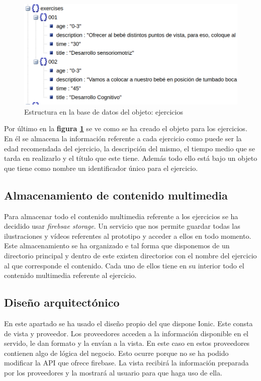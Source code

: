 \medskip
\begin{figure}
    \includegraphics[width=\linewidth]{./images/database/exercises-database.png}
    \caption{Estructura en la base de datos del objeto: ejercicios}
    \label{ejercicios}
\end{figure}

Por último en la \textbf{figura \ref{ejercicios}} se ve
como se ha creado el objeto para los ejercicios. En él se almacena la información
referente a cada ejercicio como puede ser la edad recomendada del ejercicio,
la descripción del mismo, el tiempo medio que se tarda en realizarlo y el
título que este tiene. Además todo ello está bajo un objeto que tiene como
nombre un identificador único para el ejercicio.

\subsection{Almacenamiento de contenido multimedia}

Para almacenar todo el contenido multimedia referente a los ejercicios se ha
decidido usar \textit{firebsae storage}. Un servicio que nos permite guardar
todas las ilustraciones y vídeos referentes al prototipo y acceder a ellos en
todo momento. Este almacenamiento se ha organizado e tal forma que disponemos
de un directorio principal y dentro de este existen directorios con el nombre
del ejercicio al que corresponde el contenido. Cada uno de ellos tiene en su
interior todo el contenido multimedia referente al ejercicio.

\subsection{Diseño arquitectónico}

En este apartado se ha usado el diseño propio del que dispone Ionic. Este consta
de vista y proveedor. Los proveedores acceden a la información disponible en el
servido, le dan formato y la envían a la vista. En este caso en estos proveedores
contienen algo de lógica del negocio. Esto ocurre porque no se ha podido modificar
la API que ofrece firebase. La vista recibirá la información preparada por los
proveedores y la mostrará al usuario para que haga uso de ella.